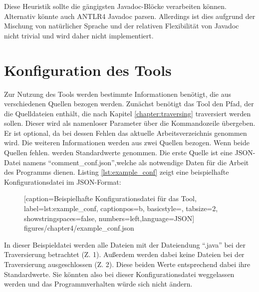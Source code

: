 Diese Heuristik sollte die gängigsten Javadoc-Blöcke verarbeiten können. Alternativ könnte auch ANTLR4 Javadoc parsen. Allerdings ist dies aufgrund der Mischung von natürlicher Sprache und der relativen Flexibilität von Javadoc nicht trivial und wird daher nicht implementiert. 



\section{Konfiguration des Tools}\label{chapter:conf}
Zur Nutzung des Tools werden bestimmte Informationen benötigt, die aus verschiedenen Quellen bezogen werden. Zunächst benötigt das Tool den Pfad, der die Quelldateien enthält, die nach Kapitel \ref{chapter:traversing} traversiert werden sollen. Dieser wird als namenloser Parameter über die Kommandozeile übergeben. Er ist optional, da bei dessen Fehlen das aktuelle Arbeitsverzeichnis genommen wird. Die weiteren Informationen werden aus zwei Quellen bezogen. Wenn beide Quellen fehlen. werden Standardwerte genommen. Die erste Quelle ist eine \ac{JSON}-Datei namens \enquote{comment\_conf.json},welche als notwendige Daten für die Arbeit des Programms dienen. Listing \ref{lst:example_conf} zeigt eine beispielhafte Konfigurationsdatei im \ac{JSON}-Format:

\begin{figure}[htbp]

[caption={Beispielhafte Konfigurationsdatei für das Tool},
label={lst:example_conf},
captionpos=b, basicstyle=\footnotesize, tabsize=2, showstringspaces=false,  numbers=left,language=JSON]
{figures/chapter4/example_conf.json}
\end{figure}

In dieser Beispieldatei  werden alle Dateien mit der Dateiendung \enquote{.java} bei der Traversierung betrachtet (Z. 1). Außerdem werden dabei keine Dateien bei der Traversierung ausgeschlossen (Z. 2). Diese beiden Werte entsprechend dabei ihre Standardwerte. Sie könnten also bei dieser Konfigurationsdatei weggelassen werden und das Programmverhalten würde sich nicht ändern.

